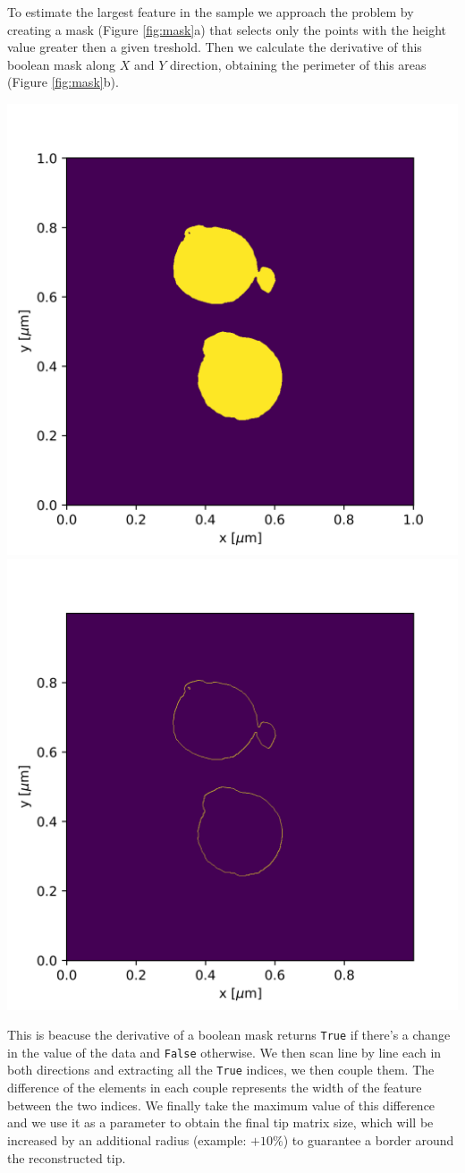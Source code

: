 \documentclass{article}
\begin{document}
To estimate the largest feature in the sample we approach the problem by creating a mask (Figure \ref{fig:mask}a) that selects only the points with the height value greater then a given treshold.
Then we calculate the derivative of this boolean mask along $X$ and $Y$ direction, obtaining the perimeter of this areas (Figure \ref{fig:mask}b).

\begin{center}
    \includegraphics[width=.45\textwidth]{../images/maschera_picchi.png}
    \hfill
    \includegraphics[width=.45\textwidth]{../images/derivatives.png}
    \label{fig:mask}
\end{center}

This is beacuse the derivative of a boolean mask returns \texttt{True} if there's a change in the value of the data and \texttt{False} otherwise. We then scan line by line each in both directions and extracting all the \texttt{True} indices, we then couple them. The difference of the elements in each couple represents the width of the feature between the two indices. We finally take the maximum value of this difference and we use it as a parameter to obtain the final tip matrix size, which will be increased by an additional radius (example: $+10\%$) to guarantee a border around the reconstructed tip.   
\end{document}
